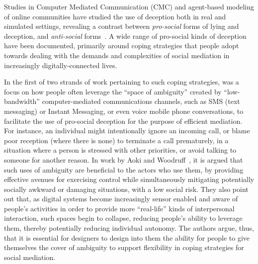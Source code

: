 \documentclass{IOS-Book-Article}     %
\begin{document}
Studies in Computer Mediated Communication (CMC) and agent-based modeling of
online communities have studied the use of deception both in real and simulated
settings, revealing a contrast between \emph{pro-social} forms of lying and
deception, and \emph{anti-social} forms~\cite{iniguez2014Deception}.
A wide range of pro-social kinds of deception have
been documented, primarily around coping strategies that people adopt towards
dealing with the demands and complexities of social mediation in increasingly
digitally-connected lives.            

In the first of two strands of work pertaining to such coping strategies, was a
focus on how people often leverage the ``space of ambiguity'' created by
``low-bandwidth'' computer-mediated communications channels, such as SMS (text
messaging) or Instant Messaging, or even voice mobile phone conversations, to
facilitate the use of pro-social deception for the purpose of efficient
mediation.  For instance, an individual might intentionally ignore an incoming
call, or blame poor reception (where there is none) to terminate a call
prematurely, in a situation where a person is stressed with other priorities, or
avoid talking to someone for another reason.  In work by Aoki and Woodruff~\cite{Aoki:2005:MSS:1054972.1054998}, it is argued that such uses of ambiguity
are beneficial to the actors who use them, by providing effective avenues for
exercising control while simultaneously mitigating potentially socially awkward
or damaging situations, with a low social risk.  They also point out that, as digital systems become increasingly
sensor enabled and aware of people's activities in order to provide more
``real-life'' kinds of interpersonal interaction, such spaces begin to collapse,
reducing people's ability to leverage them, thereby potentially reducing
individual autonomy.  The authors argue, thus, that it is essential for
designers to design into them the ability for people to give themselves the
cover of ambiguity to support flexibility in coping strategies for social
mediation.                     
\end{document}
